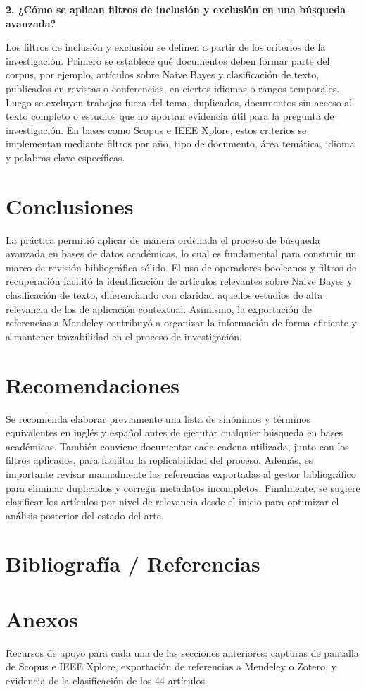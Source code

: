 \documentclass[11pt,a4paper]{article}
\begin{document}
\textbf{2. ¿Cómo se aplican filtros de inclusión y exclusión en una búsqueda avanzada?}

Los filtros de inclusión y exclusión se definen a partir de los criterios de la investigación. Primero se establece qué documentos deben formar parte del corpus, por ejemplo, artículos sobre Naive Bayes y clasificación de texto, publicados en revistas o conferencias, en ciertos idiomas o rangos temporales. Luego se excluyen trabajos fuera del tema, duplicados, documentos sin acceso al texto completo o estudios que no aportan evidencia útil para la pregunta de investigación. En bases como Scopus e IEEE Xplore, estos criterios se implementan mediante filtros por año, tipo de documento, área temática, idioma y palabras clave específicas.

\section{Conclusiones}

La práctica permitió aplicar de manera ordenada el proceso de búsqueda avanzada en bases de datos académicas, lo cual es fundamental para construir un marco de revisión bibliográfica sólido. El uso de operadores booleanos y filtros de recuperación facilitó la identificación de artículos relevantes sobre Naive Bayes y clasificación de texto, diferenciando con claridad aquellos estudios de alta relevancia de los de aplicación contextual. Asimismo, la exportación de referencias a Mendeley contribuyó a organizar la información de forma eficiente y a mantener trazabilidad en el proceso de investigación.

\section{Recomendaciones}

Se recomienda elaborar previamente una lista de sinónimos y términos equivalentes en inglés y español antes de ejecutar cualquier búsqueda en bases académicas. También conviene documentar cada cadena utilizada, junto con los filtros aplicados, para facilitar la replicabilidad del proceso. Además, es importante revisar manualmente las referencias exportadas al gestor bibliográfico para eliminar duplicados y corregir metadatos incompletos. Finalmente, se sugiere clasificar los artículos por nivel de relevancia desde el inicio para optimizar el análisis posterior del estado del arte.

\section{Bibliografía / Referencias}

\nocite{*}



\section{Anexos}
Recursos de apoyo para cada una de las secciones anteriores: capturas de pantalla de Scopus e IEEE Xplore, exportación de referencias a Mendeley o Zotero, y evidencia de la clasificación de los 44 artículos.
\end{document}
